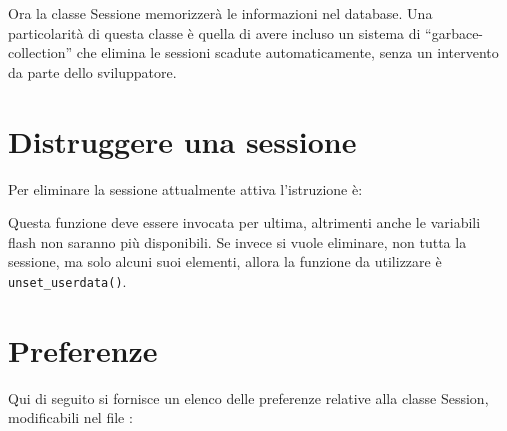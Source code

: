 Ora la classe Sessione memorizzerà le informazioni nel database. Una particolarità di questa classe è quella di avere incluso un sistema di ``garbace-collection'' che elimina le sessioni scadute automaticamente, senza un intervento da parte dello sviluppatore.

\section*{Distruggere una sessione}

Per eliminare la sessione attualmente attiva l'istruzione è:


Questa funzione deve essere invocata per ultima, altrimenti anche le variabili flash non saranno più disponibili. Se invece si vuole eliminare, non tutta la sessione, ma solo alcuni suoi elementi, allora la funzione da utilizzare è \verb|unset_userdata()|.

\section*{Preferenze}

Qui di seguito si fornisce un elenco delle preferenze relative alla classe Session, modificabili nel file :

\small


